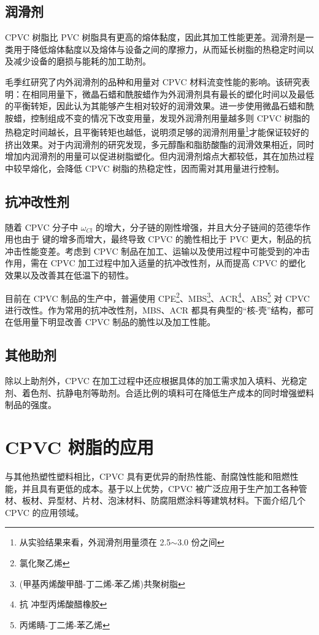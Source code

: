 \subsection{润滑剂}
CPVC 树脂比 PVC 树脂具有更高的熔体黏度，因此其加工性能更差。润滑剂是一类用于降低熔体黏度以及熔体与设备之间的摩擦力，从而延长树脂的热稳定时间以及减少设备的磨损与能耗的加工助剂。\par
毛季红\cite{2}研究了内外润滑剂的品种和用量对 CPVC 材料流变性能的影响。该研究表明：在相同用量下，微晶石蜡和酰胺蜡作为外润滑剂具有最长的塑化时间以及最低的平衡转矩，因此认为其能够产生相对较好的润滑效果。进一步使用微晶石蜡和酰胺蜡，控制组成不变的情况下改变用量，发现外润滑剂用量越多则 CPVC 树脂的热稳定时间越长，且平衡转矩也越低，说明须足够的润滑剂用量\footnote{从实验结果来看，外润滑剂用量须在 2.5$\sim$3.0 份之间}才能保证较好的挤出效果。对于内润滑剂的研究发现，多元醇酯和脂肪酸酯的润滑效果相近，同时增加内润滑剂的用量可以促进树脂塑化。但内润滑剂熔点大都较低，其在加热过程中较早熔化，会降低 CPVC 树脂的热稳定性，因而需对其用量进行控制。

\subsection{抗冲改性剂}
随着 CPVC 分子中 $\omega_{Cl}$ 的增大，分子链的刚性增强，并且大分子链间的范德华作用也由于  键的增多而增大，最终导致 CPVC 的脆性相比于 PVC 更大，制品的抗冲击性能变差。考虑到 CPVC 制品在加工、运输以及使用过程中可能受到的冲击作用，需在 CPVC 加工过程中加入适量的抗冲改性剂，从而提高 CPVC 的塑化效果以及改善其在低温下的韧性。\par
目前在 CPVC 制品的生产中，普遍使用 CPE\footnote{氯化聚乙烯}、MBS\footnote{(甲基丙烯酸甲醋-丁二烯-苯乙烯)共聚树脂}、ACR\footnote{抗 冲型丙烯酸醋橡胶}、ABS\footnote{丙烯睛-丁二烯-苯乙烯} 对 CPVC 进行改性。作为常用的抗冲改性剂，MBS、ACR 都具有典型的“核-壳”结构，都可在低用量下明显改善 CPVC 制品的脆性以及加工性能\cite{24}。

\subsection{其他助剂}
除以上助剂外，CPVC 在加工过程中还应根据具体的加工需求加入填料、光稳定剂、着色剂、抗静电剂等助剂。合适比例的填料可在降低生产成本的同时增强塑料制品的强度。


\section{CPVC 树脂的应用}
与其他热塑性塑料相比，CPVC 具有更优异的耐热性能、耐腐蚀性能和阻燃性能，并且具有更低的成本。基于以上优势，CPVC 被广泛应用于生产加工各种管材、板材、异型材、片材、泡沫材料、防腐阻燃涂料等建筑材料\cite{5}。下面介绍几个 CPVC 的应用领域。

